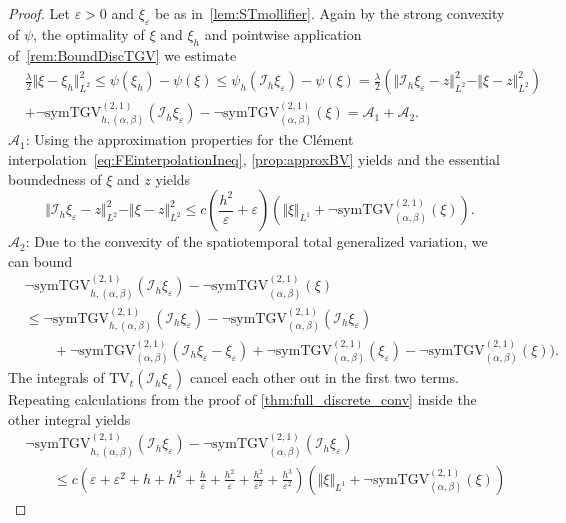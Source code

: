 \documentclass{article}
\newcommand{\NSymTGV}{\neg \mathrm{symTGV}}
\newcommand{\TV}{\mathrm{TV}}
\begin{document}
	\begin{proof}
		Let $\varepsilon > 0$ and $\xi_\varepsilon$ be as in~\cref{lem:STmollifier}. Again by the strong convexity of $\psi$, the optimality of $\xi$ and $\xi_{h}$ and pointwise application of~\cref{rem:BoundDiscTGV} we estimate
		\begin{align*}
			&\frac{\lambda}{2}\Vert \xi - \xi_{h}\Vert_{L^2}^2 \leq \psi(\xi_{h}) - \psi(\xi) \leq \psi_h(\mathcal{I}_h\xi_\varepsilon) - \psi(\xi)= \frac{\lambda}{2}(\Vert \mathcal{I}_h\xi_\varepsilon - z\Vert_{L^2}^2 -  \Vert \xi - z\Vert_{L^2}^2)\\
			&+\NSymTGV_{h, (\alpha, \beta)}^{(2, 1)}(\mathcal{I}_h\xi_\varepsilon) -\NSymTGV_{(\alpha, \beta)}^{(2, 1)}(\xi)   = \mathcal{A}_1 + \mathcal{A}_2.
		\end{align*}
		$\mathcal{A}_1$:
		Using the approximation properties for the Clément interpolation~\cref{eq:FEinterpolationIneq}, \cref{prop:approxBV} yields and the essential boundedness of $\xi$ and $z$ yields
		\begin{equation*}
			\Vert \mathcal{I}_h\xi_\varepsilon - z\Vert _{L^2}^2 -  \Vert \xi - z\Vert _{L^2}^2 \leq c\left(\frac{h^2}{\varepsilon} + \varepsilon\right)\left(\Vert \xi \Vert_{L^1} + \NSymTGV_{(\alpha, \beta)}^{(2, 1)}(\xi)\right).
		\end{equation*}
		$\mathcal{A}_2$:
		Due to the convexity of the spatiotemporal total generalized variation, we can bound
		\begin{align*}
			&\NSymTGV_{h, (\alpha, \beta)}^{(2, 1)}(\mathcal{I}_h\xi_\varepsilon) -\NSymTGV_{(\alpha, \beta)}^{(2, 1)}(\xi)\\
			&\leq \NSymTGV_{h, (\alpha, \beta)}^{(2, 1)}(\mathcal{I}_h\xi_\varepsilon) - \NSymTGV_{(\alpha, \beta)}^{(2, 1)}(\mathcal{I}_h\xi_\varepsilon)\\
			&\qquad+\NSymTGV_{(\alpha, \beta)}^{(2, 1)}(\mathcal{I}_h\xi_\varepsilon -\xi_\varepsilon)  + \NSymTGV_{(\alpha, \beta)}^{(2, 1)}(\xi_\varepsilon)-\NSymTGV_{(\alpha, \beta)}^{(2, 1)}(\xi)).
		\end{align*}
		The integrals of $\TV_t(\mathcal{I}_h\xi_\varepsilon)$ cancel each other out in the first two terms.
		Repeating calculations from the proof of \cref{thm:full_discrete_conv} inside the other integral yields
		\begin{align*}
			&\NSymTGV_{h, (\alpha, \beta)}^{(2, 1)}(\mathcal{I}_h\xi_\varepsilon) - \NSymTGV_{(\alpha, \beta)}^{(2, 1)}(\mathcal{I}_h\xi_\varepsilon)\\
			&\qquad\leq c(\varepsilon + \varepsilon^2 + h + h^2 + \frac{h}{\varepsilon} + \frac{h^2}{\varepsilon} + \frac{h^2}{\varepsilon^2} + \frac{h^3}{\varepsilon^2} )\left(\Vert \xi \Vert_{L^1} + \NSymTGV_{(\alpha, \beta)}^{(2, 1)}(\xi)\right)

\end{align*}
\end{proof}
\end{document}
